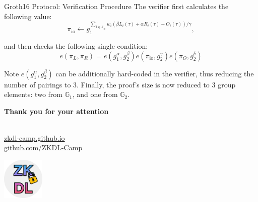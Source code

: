 \documentclass{zkdl-presentation-template}
\begin{document}
    \begin{frame}{Groth16 Protocol: Verification Procedure}
        The verifier first calculates the following value:
        \begin{equation*}
            \pi_{\text{io}} \gets g_1^{\sum_{i \in \mathcal{I}_{\text{io}}}w_i(\beta L_i(\tau) + \alpha R_i(\tau) + O_i(\tau))/\gamma},
        \end{equation*}

        and then checks the following single condition:
        \begin{equation*}
            e(\pi_L, \pi_R) = e(g_1^{\alpha}, g_2^{\beta})e(\pi_{\text{io}},g_2^{\gamma})e(\pi_O,g_2^{\delta})
        \end{equation*}
        
        \begin{alertblock}{Note}
            $e(g_1^{\alpha}, g_2^{\beta})$ can be additionally hard-coded in the verifier, thus reducing the number of pairings to 3. Finally, the proof's size is now reduced to 3 group elements: two from $\mathbb{G}_1$, and one from $\mathbb{G}_2$.
        \end{alertblock}
    \end{frame}

    \begin{frame}
        \centering
        \LARGE
        \textbf{Thank you for your attention} \\
        
        \vspace{0.2cm} \Huge {} \large \\
        
        \vspace{1cm}
  
        \href{https://zkdl-camp.github.io/}{\hspace{.325em}zkdl-camp.github.io} \\
  
        \href{https://github.com/ZKDL-Camp}{\hspace{.325em}github.com/ZKDL-Camp}
        
        \begin{center}
            \includegraphics[width=0.15\textwidth]{images/logo.png}
        \end{center}
    \end{frame}
\end{document}

